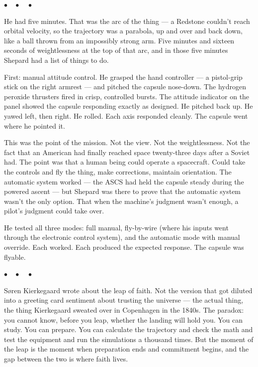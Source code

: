 \documentclass[12pt, letterpaper]{article}
\begin{document}
\begin{center}
$\bullet\quad\bullet\quad\bullet$
\end{center}

He had five minutes. That was the arc of the thing --- a Redstone couldn't reach orbital velocity, so the trajectory was a parabola, up and over and back down, like a ball thrown from an impossibly strong arm. Five minutes and sixteen seconds of weightlessness at the top of that arc, and in those five minutes Shepard had a list of things to do.

First: manual attitude control. He grasped the hand controller --- a pistol-grip stick on the right armrest --- and pitched the capsule nose-down. The hydrogen peroxide thrusters fired in crisp, controlled bursts. The attitude indicator on the panel showed the capsule responding exactly as designed. He pitched back up. He yawed left, then right. He rolled. Each axis responded cleanly. The capsule went where he pointed it.

This was the point of the mission. Not the view. Not the weightlessness. Not the fact that an American had finally reached space twenty-three days after a Soviet had. The point was that a human being could operate a spacecraft. Could take the controls and fly the thing, make corrections, maintain orientation. The automatic system worked --- the ASCS had held the capsule steady during the powered ascent --- but Shepard was there to prove that the automatic system wasn't the only option. That when the machine's judgment wasn't enough, a pilot's judgment could take over.

He tested all three modes: full manual, fly-by-wire (where his inputs went through the electronic control system), and the automatic mode with manual override. Each worked. Each produced the expected response. The capsule was flyable.

\begin{center}
$\bullet\quad\bullet\quad\bullet$
\end{center}

S\o ren Kierkegaard wrote about the leap of faith. Not the version that got diluted into a greeting card sentiment about trusting the universe --- the actual thing, the thing Kierkegaard sweated over in Copenhagen in the 1840s. The paradox: you cannot know, before you leap, whether the landing will hold you. You can study. You can prepare. You can calculate the trajectory and check the math and test the equipment and run the simulations a thousand times. But the moment of the leap is the moment when preparation ends and commitment begins, and the gap between the two is where faith lives.
\end{document}
